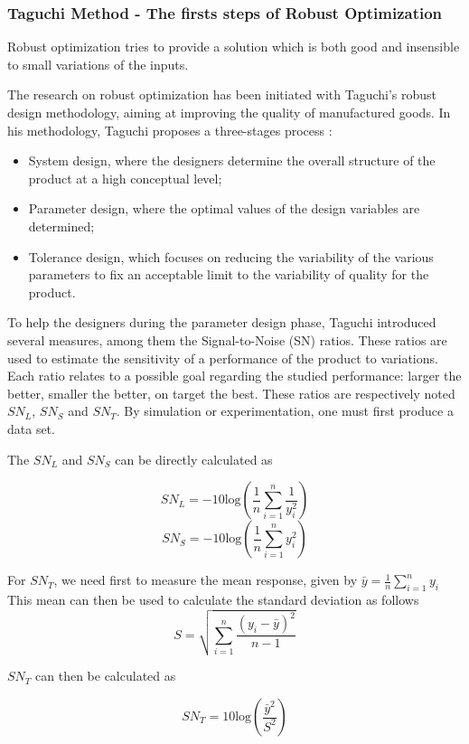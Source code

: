\subsubsection{Taguchi Method - The firsts steps of Robust Optimization }

Robust optimization tries to provide a solution which is both good and insensible to small variations of the inputs.

The research on robust optimization has been initiated with Taguchi's robust design methodology\cite{tsui1992overview}, aiming at improving the quality of manufactured goods.
In his methodology, Taguchi proposes a three-stages process :
\begin{itemize}
\item System design, where the designers determine the overall structure of the product at a high conceptual level;
\item Parameter design, where the optimal values of the design variables are determined;
\item Tolerance design, which focuses on reducing the variability of the  various parameters to fix an acceptable limit to the variability of quality for the product.
\end{itemize}

To help the designers during the parameter design phase, Taguchi introduced several measures, among them the Signal-to-Noise (SN) ratios. These ratios are used to estimate the sensitivity of a performance of the product to variations. Each ratio relates to a possible goal regarding the studied performance: larger the better, smaller the better, on target the best. These ratios are respectively noted $SN_L$, $SN_S$ and $SN_T$.
By simulation or experimentation, one must first produce a data set.

The $SN_L$ and $SN_S$ can be directly calculated as

\[SN_L = -10\text{log}\left( \frac{1}{n} \sum_{i=1}^n \frac{1}{y_i^2} \right)\]
\[SN_S = -10\text{log}\left( \frac{1}{n} \sum_{i=1}^n y_i^2 \right)\]

For $SN_T$, we need first to measure the mean response, given by $\bar{y} = \frac{1}{n}\displaystyle\sum_{i=1}^n y_i$
This mean can then be used to calculate the standard deviation as follows 
\[S = \sqrt{\sum_{i=1}^n \frac{(y_i - \bar{y})^2}{n-1}}\]

 $SN_T$ can then be calculated as
 
 \[ SN_T = 10\text{log}\left(\frac{\bar{y}^2}{S^2}\right) \]
 

